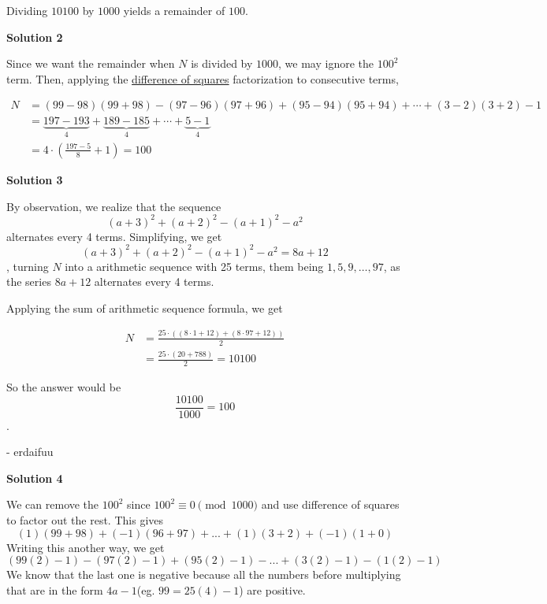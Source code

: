 \begin{enumerate}
 Dividing $10100$ by $1000$ yields a remainder of $\boxed{100}$.

 



\textbf{Solution 2}

Since we want the remainder when $N$ is divided by $1000$, we may ignore the $100^2$ term. Then, applying the \href{https://artofproblemsolving.com/wiki/index.php?title=Difference\_of\_squares}{difference of squares} factorization to consecutive terms,

 
 \begin{align*} N &= (99-98)(99+98) - (97-96)(97+96) + (95-94)(95 + 94) + \cdots + (3-2)(3+2) - 1 \\ &= \underbrace{197 - 193}_4 + \underbrace{189 - 185}_4 + \cdots + \underbrace{5 - 1}_4 \\  &= 4 \cdot \left(\frac{197-5}{8}+1\right) = \boxed{100} \end{align*}





\textbf{Solution 3}

By observation, we realize that the sequence 
 \[(a+3)^2 + (a+2)^2 - (a+1)^2 - a^2\] alternates every 4 terms. Simplifying, we get 
 \[(a+3)^2 + (a+2)^2 - (a+1)^2 - a^2 = 8a + 12\], turning $N$ into a arithmetic sequence with 25 terms, them being $1, 5, 9, \dots ,97$, as the series $8a + 12$ alternates every 4 terms.

 Applying the sum of arithmetic sequence formula, we get

 
 \begin{align*} N &= \frac{25\cdot((8\cdot1 + 12) + (8\cdot97 + 12))}{2} \\ &= \frac{25\cdot(20 + 788)}{2} = 10100 \end{align*}


 So the answer would be 
 \[\frac{10100}{1000} = \boxed{100}\].

 
- erdaifuu

 



\textbf{Solution 4}

We can remove the $100^2$ since $100^2 \equiv 0 \pmod{1000}$ and use difference of squares to factor out the rest. This gives 
 \[(1)(99+98) + (-1)(96+97) + ... +(1)(3+2) +(-1)(1+0)\] Writing this another way, we get 
 \[(99(2) - 1) - (97(2)- 1) + (95(2) - 1) -  ... +(3(2)-1) - (1(2) -1)\] We know that the last one is negative because all the numbers before multiplying that are in the form $4a - 1$(eg. $99 = 25(4) - 1$) are positive. 


\end{enumerate}
